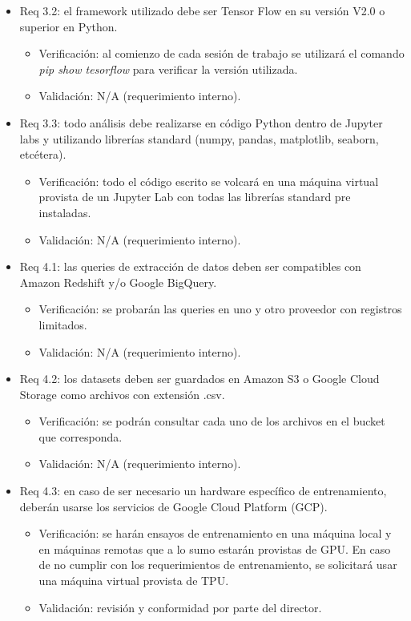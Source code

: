 \documentclass[
11pt, %
]{charter}
\begin{document}
\begin{itemize}
\item Req 3.2: el framework utilizado debe ser Tensor Flow en su versión V2.0 o superior en Python.
\begin{itemize}
	\item Verificación: al comienzo de cada sesión de trabajo se utilizará el comando \emph{pip show tesorflow} para verificar la versión utilizada.
	\item Validación: N/A (requerimiento interno).
\end{itemize}

\item Req 3.3: todo análisis debe realizarse en código Python dentro de Jupyter labs y utilizando librerías standard (numpy, pandas, matplotlib, seaborn, etcétera).
\begin{itemize}
	\item Verificación: todo el código escrito se volcará en una máquina virtual provista de un Jupyter Lab con todas las librerías standard pre instaladas. 
	\item Validación: N/A (requerimiento interno).
\end{itemize}

\item Req 4.1: las queries de extracción de datos deben ser compatibles con Amazon Redshift y/o Google BigQuery.
\begin{itemize}
	\item Verificación: se probarán las queries en uno y otro proveedor con registros limitados. 
	\item Validación: N/A (requerimiento interno).
\end{itemize}

\item Req 4.2: los datasets deben ser guardados en Amazon S3 o Google Cloud Storage como archivos con extensión .csv.
\begin{itemize}
	\item Verificación: se podrán consultar cada uno de los archivos en el bucket que corresponda.
	\item Validación: N/A (requerimiento interno).
\end{itemize}

\item Req 4.3: en caso de ser necesario un hardware específico de entrenamiento, deberán usarse los servicios de Google Cloud Platform (GCP).
\begin{itemize}
	\item Verificación: se harán ensayos de entrenamiento en una máquina local y en máquinas remotas que a lo sumo estarán provistas de GPU. En caso de no cumplir con los requerimientos de entrenamiento, se solicitará usar una máquina virtual provista de TPU.
	\item Validación: revisión y conformidad por parte del director.
\end{itemize}


\end{itemize}
\end{document}

